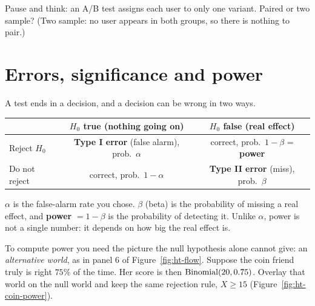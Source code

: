 \begin{recoverybox}
Pause and think: an A/B test assigns each user to only one variant. Paired or two
sample? (Two sample: no user appears in both groups, so there is nothing to pair.)
\end{recoverybox}

\section{Errors, significance and power}
\label{sec:ht-power}

A test ends in a decision, and a decision can be wrong in two ways.

\begin{center}
\begin{tabular}{lcc}
\toprule
 & $H_0$ true (nothing going on) & $H_0$ false (real effect)\\
\midrule
Reject $H_0$ & \textbf{Type I error} (false alarm), prob.\ $\alpha$ & correct, prob.\ $1-\beta$ = \textbf{power}\\
Do not reject & correct, prob.\ $1-\alpha$ & \textbf{Type II error} (miss), prob.\ $\beta$\\
\bottomrule
\end{tabular}
\end{center}

$\alpha$ is the false-alarm rate you chose. $\beta$ (beta) is the probability of
missing a real effect, and \textbf{power} $=1-\beta$ is the probability of detecting
it. Unlike $\alpha$, power is not a single number: it depends on how big the real
effect is.

To compute power you need the picture the null hypothesis alone cannot give: an
\emph{alternative world}, as in panel 6 of Figure~\ref{fig:ht-flow}. Suppose the
coin friend truly is right $75\%$ of the time.
Her score is then $\operatorname{Binomial}(20, 0.75)$. Overlay that world on the null world and keep the
same rejection rule, $X \ge 15$ (Figure~\ref{fig:ht-coin-power}).

